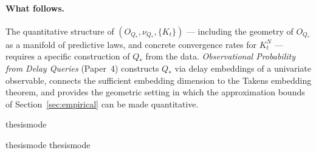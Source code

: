\paragraph{What follows.}
The quantitative structure of $(O_{Q_*},\nu_{Q_*},\{K_t\})$ ---
including the geometry of $O_{Q_*}$ as a manifold of predictive laws,
and concrete convergence rates for $K_t^N$ --- requires a specific
construction of $Q_*$ from the data.  \emph{Observational Probability
from Delay Queries} (Paper~4) constructs $Q_*$ via delay embeddings of
a univariate observable, connects the sufficient embedding dimension to
the Takens embedding theorem, and provides the geometric setting in
which the approximation bounds of Section~\ref{sec:empirical} can be
made quantitative.

\ifcsname thesismode\endcsname\else


\fi

\ifcsname thesismode\endcsname\else
\ifcsname thesismode\endcsname\else\fi
\fi
